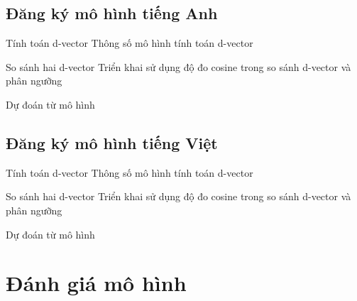\documentclass[notheorems, aspectratio=54]{beamer}
\begin{document}
\subsection{Đăng ký mô hình \textbf{tiếng Anh}}
\begin{frame}{Tính toán d-vector}
	Thông số mô hình tính toán d-vector
\end{frame}
\begin{frame}{So sánh hai d-vector}
	Triển khai sử dụng độ đo cosine trong so sánh d-vector và phân ngưỡng
\end{frame}
\begin{frame}{Dự đoán từ mô hình}
	
\end{frame}
\subsection{Đăng ký mô hình \textbf{tiếng Việt}}
\begin{frame}{Tính toán d-vector}
		Thông số mô hình tính toán d-vector
\end{frame}
\begin{frame}{So sánh hai d-vector}
	Triển khai sử dụng độ đo cosine trong so sánh d-vector và phân ngưỡng
\end{frame}
\begin{frame}{Dự đoán từ mô hình}
	
\end{frame}
\section{Đánh giá mô hình}
\end{document}
